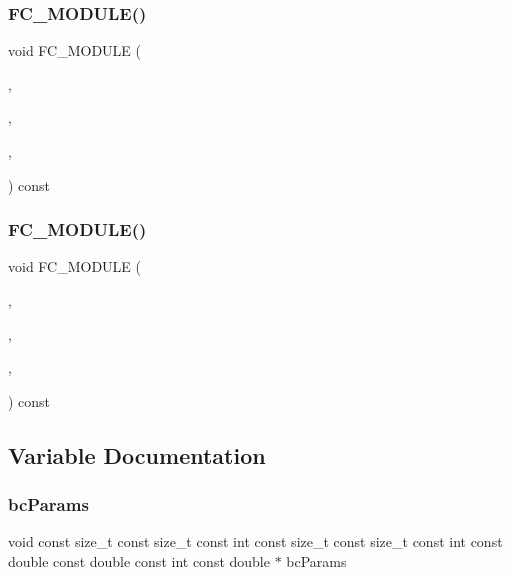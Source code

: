 \subsubsection{\texorpdfstring{F\+C\+\_\+\+M\+O\+D\+U\+L\+E()}{FC\_MODULE()}\hspace{0.1cm}{\footnotesize\ttfamily [3/4]}}
{\footnotesize\ttfamily void F\+C\+\_\+\+M\+O\+D\+U\+LE (\begin{DoxyParamCaption}\item[{satutil}]{,  }\item[{slip\+\_\+adiabatic}]{,  }\item[{S\+A\+T\+U\+T\+IL}]{,  }\item[{S\+L\+I\+P\+\_\+\+A\+D\+I\+A\+B\+A\+T\+IC}]{ }\end{DoxyParamCaption}) const}

\hypertarget{SATKernels_8H_a7dadf319d627db5174b922d8a9af8aeb}{}\label{SATKernels_8H_a7dadf319d627db5174b922d8a9af8aeb} 
\subsubsection{\texorpdfstring{F\+C\+\_\+\+M\+O\+D\+U\+L\+E()}{FC\_MODULE()}\hspace{0.1cm}{\footnotesize\ttfamily [4/4]}}
{\footnotesize\ttfamily void F\+C\+\_\+\+M\+O\+D\+U\+LE (\begin{DoxyParamCaption}\item[{satutil}]{,  }\item[{dissipationweight}]{,  }\item[{S\+A\+T\+U\+T\+IL}]{,  }\item[{D\+I\+S\+S\+I\+P\+A\+T\+I\+O\+N\+W\+E\+I\+G\+HT}]{ }\end{DoxyParamCaption}) const}



\subsection{Variable Documentation}
\hypertarget{SATKernels_8H_a498f997b8d8f027ad03132065bd1819d}{}\label{SATKernels_8H_a498f997b8d8f027ad03132065bd1819d} 
\subsubsection{\texorpdfstring{bc\+Params}{bcParams}}
{\footnotesize\ttfamily void const size\+\_\+t const size\+\_\+t const int const size\+\_\+t const size\+\_\+t const int const double const double const int const double $\ast$ bc\+Params}



